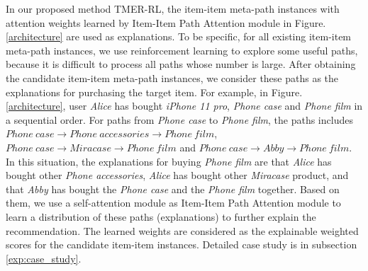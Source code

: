 In our proposed method TMER-RL, the item-item meta-path instances with attention weights learned by Item-Item Path Attention module in Figure. \ref{architecture} are used as explanations. To be specific, for all existing item-item meta-path instances, we use reinforcement learning to explore some useful paths, because it is difficult to process all paths whose number is large. After obtaining the candidate item-item meta-path instances, we consider these paths as the explanations for purchasing the target item. For example, in Figure. \ref{architecture}, user \textit{Alice} has bought \textit{iPhone 11 pro}, \textit{Phone case} and \textit{Phone film} in a sequential order. For paths from \textit{Phone case} to \textit{Phone film}, the paths includes $Phone \ case\rightarrow Phone \ accessories\rightarrow Phone \ film$, $Phone \ case\rightarrow Miracase\rightarrow Phone \ film$ and $Phone \ case\rightarrow Abby\rightarrow Phone \ film$. In this situation, the explanations for buying \textit{Phone film} are that \textit{Alice} has bought other \textit{Phone accessories}, \textit{Alice} has bought other \textit{Miracase} product, and that \textit{Abby} has bought the \textit{Phone case} and the \textit{Phone film} together. Based on them, we use a self-attention module as Item-Item Path Attention module to learn a distribution of these paths (explanations) to further explain the recommendation. The learned weights are considered as the explainable weighted scores for the candidate item-item instances. Detailed case study is in subsection \ref{exp:case_study}.




